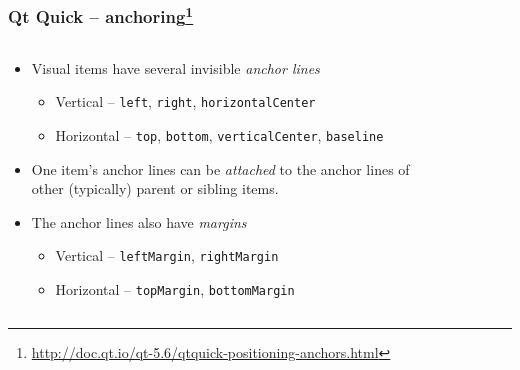 \begin{frame}
  \frametitle{Qt Quick -- anchoring\footnote
    {\url{http://doc.qt.io/qt-5.6/qtquick-positioning-anchors.html}}}
  \begin{columns}
    \begin{column}{0.68\textwidth}
    \small
    \begin{itemize}
      \item Visual items have several invisible {\em anchor lines}
      \begin{itemize}
        \footnotesize
        \item Vertical -- \texttt{left}, \texttt{right}, \texttt{horizontalCenter}
        \item Horizontal -- \texttt{top}, \texttt{bottom}, \texttt{verticalCenter},
          \texttt{baseline}
      \end{itemize}
      \item One item's anchor lines can be {\em attached} to the anchor lines
        of other (typically) parent or sibling items.
      \item The anchor lines also have {\em margins}
      \begin{itemize}
        \footnotesize
        \item Vertical -- \texttt{leftMargin}, \texttt{rightMargin}
        \item Horizontal -- \texttt{topMargin}, \texttt{bottomMargin}
      \end{itemize}
    \end{itemize}
    \end{column}
    \begin{column}{0.32\textwidth}
      \begin{figure}[!t]

\end{figure}
\end{column}
\end{columns}
\end{frame}
